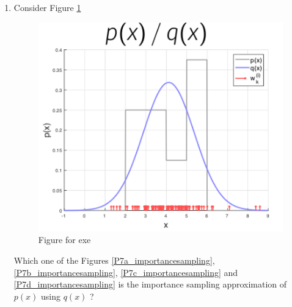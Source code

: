 \begin{enumerate}
\item Consider Figure \ref{P7_importancesampling}
\begin{figure}[!htb]
\begin{center}
\includegraphics[scale=0.320]{img/particle_filters/P7_importancesampling.png}
\end{center}
\caption{Figure for exe}
\label{P7_importancesampling}
\end{figure}

Which one of the Figures \ref{P7a_importancesampling}, \ref{P7b_importancesampling}, \ref{P7c_importancesampling} and \ref{P7d_importancesampling} is the importance sampling approximation of $p(x)$ using $q(x)$ ?


\end{enumerate}
